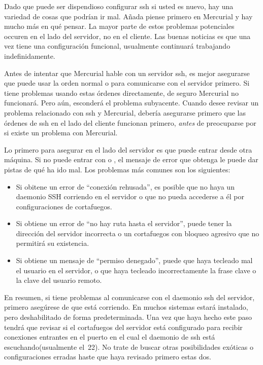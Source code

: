 Dado que puede ser dispendioso configurar ssh si usted es nuevo, hay 
una variedad de cosas que podrían ir mal.  Añada piense primero en
Mercurial y hay mucho más en qué pensar.  La mayor parte de estos
problemas potenciales occuren en el lado del servidor, no en el cliente.
Las buenas noticias es que una vez tiene una configuración funcional,
usualmente continuará trabajando indefinidamente.

Antes de intentar que Mercurial hable con un servidor ssh, es mejor
asegurarse que puede usar la orden normal  o 
para comunicarse con el servidor primero.  Si tiene problemas usando
estas órdenes directamente, de seguro Mercurial no funcionará.  Pero aún,
esconderá el problema subyacente.  Cuando desee revisar un problema
relacionado con ssh y Mercurial, debería asegurarse primero que las
órdenes de ssh en el lado del cliente funcionan primero, \emph{antes}
de preocuparse por si existe un problema con Mercurial.

Lo primero para asegurar en el lado del servidor es que puede entrar
desde otra máquina.  Si no puede entrar con  o 
, el mensaje de error que obtenga le puede dar pistas
de qué ha ido mal.  Los problemas más comunes son los siguientes:
\begin{itemize}
\item Si obitene un error de ``conexión rehusada'', es posible que no 
  haya un daemonio SSH corriendo en el servidor o que no pueda accederse
  a él por configuraciones de cortafuegos.
\item Si obtiene un error de ``no hay ruta hasta el servidor'', puede
  tener la dirección del servidor incorrecta o un cortafuegos con
  bloqueo agresivo que no permitirá su existencia.
\item Si obtiene un mensaje de ``permiso denegado'', puede que haya
  tecleado mal el usuario en el servidor, o que haya tecleado
  incorrectamente la frase clave o la clave del usuario remoto.
\end{itemize}
En resumen, si tiene problemas al comunicarse con el daemonio ssh del
servidor, primero asegúrese de que está corriendo.  En muchos sistemas
estará instalado, pero deshabilitado de forma predeterminada.  Una vez
que haya hecho este paso tendrá que revisar si el cortafuegos del
servidor está configurado para recibir conexiones entrantes en el
puerto en el cual el daemonio de ssh está escuchando(usualmente el~22).
No trate de buscar otras posibilidades exóticas o configuraciones
erradas haste que haya revisado primero estas dos.

